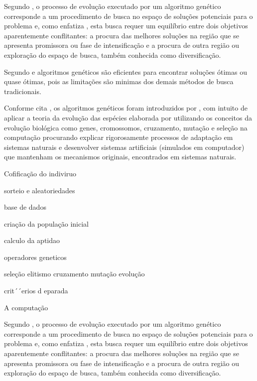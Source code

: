 \documentclass{abntpuc}
\begin{document}
Segundo \cite{oliveira2005algoritmo}, o processo de evolução executado por um algoritmo genético corresponde a um procedimento de busca no espaço de soluções potenciais para o problema e, como enfatiza \cite{michalewicz1996evolutionary}, esta busca requer um equilíbrio entre dois objetivos aparentemente conflitantes: a procura das melhores soluções na região que se apresenta promissora ou fase de intensificação e a procura de outra região ou exploração do espaço de busca, também conhecida como diversificação.\par


Segundo \cite{hamawaki2011geraccao} e \cite{oliveira2005algoritmo} algoritmos genéticos são eficientes para encontrar soluções ótimas ou quase ótimas, pois as limitações são minimas dos demais métodos de busca tradicionais.


Conforme cita \cite{oliveira2005algoritmo}, os algoritmos genéticos foram introduzidos por \cite{holland1975adaptation}, com intuito de aplicar a teoria da evolução das espécies elaborada por \cite{darwin1968origin} utilizando os conceitos da evolução biológica como genes, cromossomos, cruzamento, mutação e seleção na computação procurando explicar rigorosamente processos de adaptação em sistemas naturais e desenvolver sistemas artificiais (simulados em computador) que mantenham os mecanismos originais, encontrados em sistemas naturais.\par








Cofificação do indiviruo 

sorteio e aleatoriedades

base de dados

criação da população inicial

calculo da aptidao

operadores geneticos

seleção 
elitismo 
cruzamento
mutação
evolução

crit´´erios d eparada



A computação 





Segundo \cite{oliveira2005algoritmo}, o processo de evolução executado por um algoritmo genético corresponde a um procedimento de busca no espaço de soluções potenciais para o problema e, como enfatiza \cite{michalewicz1996evolutionary}, esta busca requer um equilíbrio entre dois objetivos aparentemente conflitantes: a procura das melhores soluções na região que se apresenta promissora ou fase de intensificação e a procura de outra região ou exploração do espaço de busca, também conhecida como diversificação.\par
\end{document}
